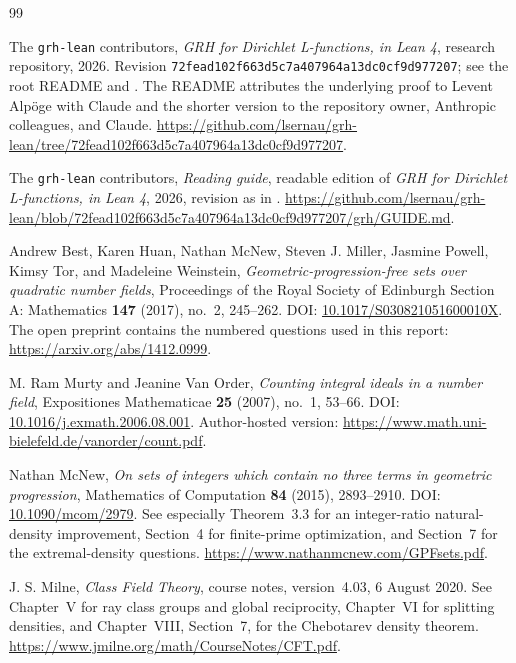 \begin{thebibliography}{99}
\small\raggedright

The \texttt{grh-lean} contributors,
\emph{GRH for Dirichlet L-functions, in Lean 4},
research repository, 2026.
Revision \texttt{72fead102f663d5c7a407964a13dc0cf9d977207};
see the root README and .
The README attributes the underlying proof to Levent Alp\"oge with
Claude and the shorter version to the repository owner, Anthropic
colleagues, and Claude.
\url{https://github.com/lsernau/grh-lean/tree/72fead102f663d5c7a407964a13dc0cf9d977207}.

The \texttt{grh-lean} contributors,
\emph{Reading guide}, readable edition of \emph{GRH for Dirichlet
L-functions, in Lean 4}, 2026, revision as in \cite{repo}.
\url{https://github.com/lsernau/grh-lean/blob/72fead102f663d5c7a407964a13dc0cf9d977207/grh/GUIDE.md}.

Andrew Best, Karen Huan, Nathan McNew, Steven J. Miller,
Jasmine Powell, Kimsy Tor, and Madeleine Weinstein,
\emph{Geometric-progression-free sets over quadratic number fields},
Proceedings of the Royal Society of Edinburgh Section A: Mathematics
\textbf{147} (2017), no.~2, 245--262.
DOI: \href{https://doi.org/10.1017/S030821051600010X}
{10.1017/S030821051600010X}.
The open preprint contains the numbered questions used in this report:
\url{https://arxiv.org/abs/1412.0999}.

M. Ram Murty and Jeanine Van Order,
\emph{Counting integral ideals in a number field},
Expositiones Mathematicae \textbf{25} (2007), no.~1, 53--66.
DOI: \href{https://doi.org/10.1016/j.exmath.2006.08.001}
{10.1016/j.exmath.2006.08.001}.
Author-hosted version:
\url{https://www.math.uni-bielefeld.de/vanorder/count.pdf}.

Nathan McNew,
\emph{On sets of integers which contain no three terms in geometric
progression},
Mathematics of Computation \textbf{84} (2015), 2893--2910.
DOI: \href{https://doi.org/10.1090/mcom/2979}{10.1090/mcom/2979}.
See especially Theorem~3.3 for an integer-ratio natural-density
improvement, Section~4 for finite-prime optimization, and Section~7
for the extremal-density questions.
\url{https://www.nathanmcnew.com/GPFsets.pdf}.

J. S. Milne,
\emph{Class Field Theory}, course notes, version~4.03,
6 August 2020.
See Chapter~V for ray class groups and global reciprocity,
Chapter~VI for splitting densities, and Chapter~VIII, Section~7,
for the Chebotarev density theorem.
\url{https://www.jmilne.org/math/CourseNotes/CFT.pdf}.


\end{thebibliography}
